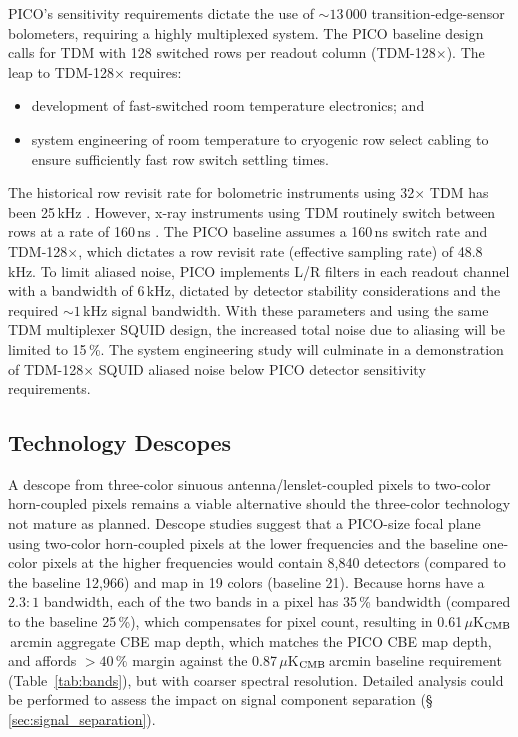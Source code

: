 PICO's sensitivity requirements dictate the use of $\sim 13\,000$
transition-edge-sensor bolometers, requiring a highly multiplexed
system.  The PICO baseline design calls for TDM
with 128 switched rows per readout column (TDM-128$\times$). The leap
to TDM-128$\times$ requires:
\begin{itemize}
\item development of fast-switched room temperature electronics; and
\item system engineering of room temperature to cryogenic row select cabling to ensure sufficiently fast row switch settling times.
\end{itemize}

The historical row revisit rate for bolometric instruments using
32$\times$ TDM has been 25\,kHz \cite[e.g.,][]{BICEP2015}. However,
x-ray instruments using TDM routinely switch between rows at a rate of
160\,ns \citep{Doriese2016}. The PICO baseline assumes a 160\,ns
switch rate and TDM-128$\times$, which dictates a row revisit rate
(effective sampling rate) of 48.8\,kHz. To limit aliased noise, PICO
implements L/R filters in each readout channel with a bandwidth of
6\,kHz, dictated by detector stability considerations and the required
$\sim1$\,kHz signal bandwidth.  With these parameters and using the
same TDM multiplexer SQUID design, the increased total noise due to
aliasing will be limited to 15\,\%.  The system engineering study will
culminate in a demonstration of TDM-128$\times$ SQUID aliased noise
below PICO detector sensitivity requirements.


\subsection{Technology Descopes}
\label{sec:technology_descopes} %

A descope from three-color sinuous antenna/lenslet-coupled pixels to two-color horn-coupled pixels remains a viable
alternative should the three-color technology not mature as
planned. Descope studies suggest that a PICO-size focal plane using
two-color horn-coupled pixels at the lower frequencies and the baseline one-color
pixels at the higher frequencies would contain 8,840 detectors
(compared to the baseline 12,966) and map in 19 colors (baseline
21). Because horns have a $2.3:1$ bandwidth, each of the two bands in
a pixel has 35\,\% bandwidth (compared to the baseline 25\,\%), which
compensates for pixel count, resulting in
0.61\,$\mu$K$_{\rm CMB}$\,arcmin aggregate CBE map depth, which
matches the PICO CBE map depth, and affords $>40\,\%$ margin against
the 0.87\,$\mu$K$_{\rm CMB}$\,arcmin baseline requirement
(Table~\ref{tab:bands}), but with coarser spectral resolution.
Detailed analysis could be performed to assess the impact on signal component separation (\S\,\ref{sec:signal_separation}).

